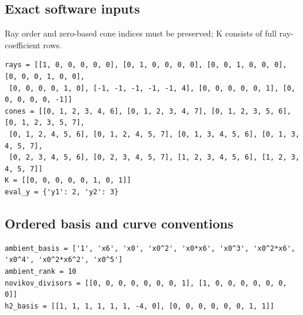\documentclass[10pt,a4paper]{article}
\begin{document}
\subsection*{Exact software inputs}
Ray order and zero-based cone indices must be preserved; K consists of full ray-coefficient rows.
\begin{lstlisting}
rays = [[1, 0, 0, 0, 0, 0], [0, 1, 0, 0, 0, 0], [0, 0, 1, 0, 0, 0], [0, 0, 0, 1, 0, 0],
 [0, 0, 0, 0, 1, 0], [-1, -1, -1, -1, -1, 4], [0, 0, 0, 0, 0, 1], [0, 0, 0, 0, 0, -1]]
cones = [[0, 1, 2, 3, 4, 6], [0, 1, 2, 3, 4, 7], [0, 1, 2, 3, 5, 6], [0, 1, 2, 3, 5, 7],
 [0, 1, 2, 4, 5, 6], [0, 1, 2, 4, 5, 7], [0, 1, 3, 4, 5, 6], [0, 1, 3, 4, 5, 7],
 [0, 2, 3, 4, 5, 6], [0, 2, 3, 4, 5, 7], [1, 2, 3, 4, 5, 6], [1, 2, 3, 4, 5, 7]]
K = [[0, 0, 0, 0, 0, 1, 0, 1]]
eval_y = {'y1': 2, 'y2': 3}
\end{lstlisting}
\subsection*{Ordered basis and curve conventions}
\begin{lstlisting}
ambient_basis = ['1', 'x6', 'x0', 'x0^2', 'x0*x6', 'x0^3', 'x0^2*x6', 'x0^4', 'x0^2*x6^2', 'x0^5']
ambient_rank = 10
novikov_divisors = [[0, 0, 0, 0, 0, 0, 0, 1], [1, 0, 0, 0, 0, 0, 0, 0]]
h2_basis = [[1, 1, 1, 1, 1, 1, -4, 0], [0, 0, 0, 0, 0, 0, 1, 1]]
\end{lstlisting}
\end{document}
